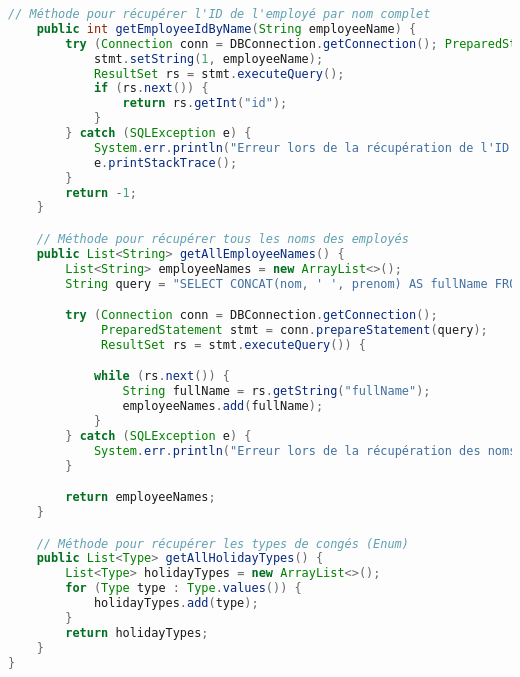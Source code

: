 \documentclass[a4paper,12pt]{article}
\begin{document}
\begin{lstlisting}[language=Java, caption={DAO HolidayDAOImpl}, label={lst:holidayDAOImpl}]
    // Méthode pour récupérer l'ID de l'employé par nom complet
    public int getEmployeeIdByName(String employeeName) {
        try (Connection conn = DBConnection.getConnection(); PreparedStatement stmt = conn.prepareStatement(SELECT_EMPLOYEE_ID_BY_NAME_SQL)) {
            stmt.setString(1, employeeName);
            ResultSet rs = stmt.executeQuery();
            if (rs.next()) {
                return rs.getInt("id");
            }
        } catch (SQLException e) {
            System.err.println("Erreur lors de la récupération de l'ID employé : " + e.getMessage());
            e.printStackTrace();
        }
        return -1;
    }

    // Méthode pour récupérer tous les noms des employés
    public List<String> getAllEmployeeNames() {
        List<String> employeeNames = new ArrayList<>();
        String query = "SELECT CONCAT(nom, ' ', prenom) AS fullName FROM employe";

        try (Connection conn = DBConnection.getConnection();
             PreparedStatement stmt = conn.prepareStatement(query);
             ResultSet rs = stmt.executeQuery()) {

            while (rs.next()) {
                String fullName = rs.getString("fullName");
                employeeNames.add(fullName);
            }
        } catch (SQLException e) {
            System.err.println("Erreur lors de la récupération des noms des employés : " + e.getMessage());
        }

        return employeeNames;
    }

    // Méthode pour récupérer les types de congés (Enum)
    public List<Type> getAllHolidayTypes() {
        List<Type> holidayTypes = new ArrayList<>();
        for (Type type : Type.values()) {
            holidayTypes.add(type);
        }
        return holidayTypes;
    }
}
\end{lstlisting}

\usepackage{listings}
\usepackage{xcolor}

\end{document}
